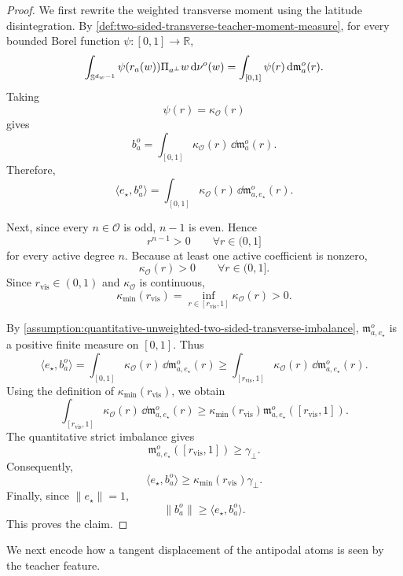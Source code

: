 \begin{proof}
We first rewrite the weighted transverse moment using the latitude
disintegration.  By
\cref{def:two-sided-transverse-teacher-moment-measure}, for every bounded
Borel function \(\psi:[0,1]\to\mathbb R\),
\[
    \int_{\mathbb{S}^{d_w-1}}
    \psi(r_a(w))\Pi_{a^\perp}w\,\dd\nu^o(w)
    =
    \int_{[0,1]}
    \psi(r)\,\dd\mathfrak m_a^o(r).
\]
Taking
\[
    \psi(r)=\kappa_{\mathcal O}(r)
\]
gives
\[
    b_a^o
    =
    \int_{[0,1]}
    \kappa_{\mathcal O}(r)\,\dd\mathfrak m_a^o(r).
\]
Therefore,
\[
    \langle e_\star,b_a^o\rangle
    =
    \int_{[0,1]}
    \kappa_{\mathcal O}(r)\,
    \dd\mathfrak m_{a,e_\star}^o(r).
\]

Next, since every \(n\in\mathcal O\) is odd, \(n-1\) is even.  Hence
\[
    r^{n-1}>0
    \qquad
    \forall r\in(0,1]
\]
for every active degree \(n\).  Because at least one active coefficient is
nonzero,
\[
    \kappa_{\mathcal O}(r)>0
    \qquad
    \forall r\in(0,1].
\]
Since \(r_{\mathrm{vis}}\in(0,1)\) and \(\kappa_{\mathcal O}\) is continuous,
\[
    \kappa_{\min}(r_{\mathrm{vis}})
    =
    \inf_{r\in[r_{\mathrm{vis}},1]}
    \kappa_{\mathcal O}(r)
    >0.
\]

By
\cref{assumption:quantitative-unweighted-two-sided-transverse-imbalance},
\(\mathfrak m_{a,e_\star}^o\) is a positive finite measure on \([0,1]\).
Thus
\[
    \langle e_\star,b_a^o\rangle
    =
    \int_{[0,1]}
    \kappa_{\mathcal O}(r)\,
    \dd\mathfrak m_{a,e_\star}^o(r)
    \ge
    \int_{[r_{\mathrm{vis}},1]}
    \kappa_{\mathcal O}(r)\,
    \dd\mathfrak m_{a,e_\star}^o(r).
\]
Using the definition of \(\kappa_{\min}(r_{\mathrm{vis}})\), we obtain
\[
    \int_{[r_{\mathrm{vis}},1]}
    \kappa_{\mathcal O}(r)\,
    \dd\mathfrak m_{a,e_\star}^o(r)
    \ge
    \kappa_{\min}(r_{\mathrm{vis}})
    \mathfrak m_{a,e_\star}^o([r_{\mathrm{vis}},1]).
\]
The quantitative strict imbalance gives
\[
    \mathfrak m_{a,e_\star}^o([r_{\mathrm{vis}},1])
    \ge
    \gamma_\perp.
\]
Consequently,
\[
    \langle e_\star,b_a^o\rangle
    \ge
    \kappa_{\min}(r_{\mathrm{vis}})\gamma_\perp.
\]
Finally, since \(\|e_\star\|=1\),
\[
    \|b_a^o\|
    \ge
    \langle e_\star,b_a^o\rangle.
\]
This proves the claim.
\end{proof}

We next encode how a tangent displacement of the antipodal atoms is seen by the
teacher feature.

